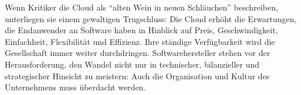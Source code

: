 Wenn Kritiker die Cloud als "`alten Wein in neuen Schläuchen"' 
 beschreiben, unterliegen sie einem 
gewaltigen Trugschluss: Die Cloud erhöht die Erwartungen, die Endanwender 
an Software haben in Hinblick auf Preis, Geschwindigkeit, Einfachheit, 
Flexibilität und Effizienz. Ihre ständige Verfügbarkeit wird die Gesellschaft 
immer weiter durchdringen. Softwarehersteller stehen vor der Herausforderung, 
den Wandel nicht nur in technischer, bilanzieller und strategischer Hinsicht zu 
meistern: Auch die Organisation und Kultur des Unternehmens muss überdacht 
werden.
\begin{comment}
Zuletzt fassen Sie Ihre Arbeit kurz zusammen und stellen Ihre wichtigsten 
Schritte, Ergebnisse und Befunde dar. Geben Sie auch einen Ausblick auf mögliche 
anknüpfende Forschungsarbeiten. Außerdem findet sich hier Platz für eine 
kritische Hinterfragung einzelner Teilaspekte und auch für Ihre eigene Meinung.

\subsection{Offene Forschungsfragen}
\begin{itemize}
	\item Wie kann sich ein ISV und ein Softwarebetratungsunternehmen auf 
die strukturellen Änderungen durch die 
Cloud-Migration bei seinen Kunden einstellen?
	\item Die identifizierten Chancen und Risiken hatten Auswirkungen im 
Bereich Visionsentwicklung/Strategie und der Anforderungsermittlung. Wie sind 
die anderen Phasen betroffen.
	\item Einflüsse der Cloud auf Marketing, Strategie und Geschäftsmodell
\end{itemize}

\subsection{Schwierigkeiten}
Trennung zwischen Kundensicht und ISV-Sicht. Siehe Dreieck.




\subsection{Abgabedokument}
\textbf{Abschlussarbeiten} (Bachelor-, Master-, Diplomarbeit) sind in zweifacher 
Ausführung, einseitig bedruckt und gebunden abzugeben. Dazu auf CD die 
Abschlussarbeit in digitaler Form (z.B. Word und PDF), inkl. der 
Endnote-Projektdatei und der Grafiken. 
\end{comment}